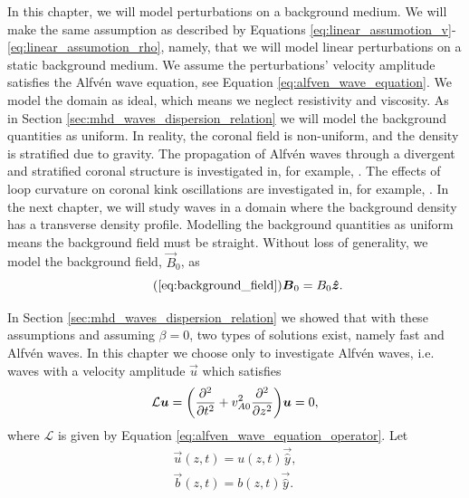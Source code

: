In this chapter, we will model perturbations on a background medium. We will make the same assumption as described by Equations \eqref{eq:linear_assumotion_v}-\eqref{eq:linear_assumotion_rho}, namely, that we will model linear perturbations on a static background medium. We assume the perturbations' velocity amplitude satisfies the Alfv\'en wave equation, see Equation \eqref{eq:alfven_wave_equation}. We model the domain as ideal, which means we neglect resistivity and viscosity. As in Section \ref{sec:mhd_waves_dispersion_relation} we will model the background quantities as uniform. In reality, the coronal field is non-uniform, and the density is stratified due to gravity. The propagation of Alfv\'en waves through a divergent and stratified coronal structure is investigated in, for example, \citet{Smith2007}. The effects of loop curvature on coronal kink oscillations are investigated in, for example, \citet{vanDoorsselaere2009}. In the next chapter, we will study waves in a domain where the background density has a transverse density profile. Modelling the background quantities as uniform means the background field must be straight. Without loss of generality, we model the background field, $\vec{B}_0$, as
\begin{equation}
    \tag{\ref{eq:background_field}}
    \vec{B}_0 = B_0\vec{\hat{z}}.
\end{equation}

In Section \ref{sec:mhd_waves_dispersion_relation} we showed that with these assumptions and assuming $\beta=0$, two types of solutions exist, namely fast and Alfv\'en waves. In this chapter we choose only to investigate Alfv\'en waves, i.e. waves with a velocity amplitude $\vec{u}$ which satisfies
\begin{equation}
    \label{eq:alfven_wave_equation2}
    \mathcal{L}\boldsymbol{u}=\qty(\pdv[2]{}{t}+v_{A0}^2\pdv[2]{}{z})\boldsymbol{u}=0,
\end{equation}
where $\mathcal{L}$ is given by Equation \eqref{eq:alfven_wave_equation_operator}.
Let
\begin{gather}
    \label{eq:y_component_of_u}
     \vec{u}(z,t) = u(z,t)\vec{\hat{y}}, \\
     \label{eq:y_component_of_b}
     \vec{b}(z,t) = b(z,t)\vec{\hat{y}}.
\end{gather}

